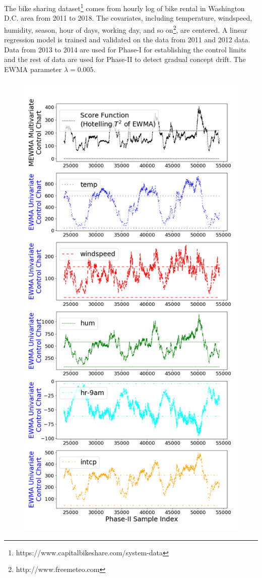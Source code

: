 \documentclass[twoside,11pt]{article}
\begin{document}
The bike sharing dataset\footnote{https://www.capitalbikeshare.com/system-data} comes from hourly log of bike rental in Washington D.C. area from 2011 to 2018. The covariates, including temperature, windspeed, humidity, season, hour of days, working day, and so on\footnote{http://www.freemeteo.com}, are centered. A linear regression model is trained and validated on the data from 2011 and 2012 data. Data from 2013 to 2014 are used for Phase-I for establishing the control limits and the rest of data are used for Phase-II to detect gradual concept drift. The EWMA parameter $ \lambda = 0.005$.
\begin{figure}[!htbp]
\centering
\includegraphics[width = 0.48\linewidth]{../figures/v14/bike_sharing/reg_scal_train/PII_pos_single_bike_mlines_with_regu_1e-08_0_0001_0_005_99_0.png}

\end{figure}
\end{document}
